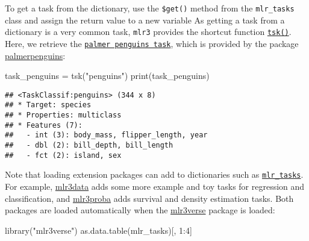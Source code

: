\documentclass[
]{scrbook}
\newenvironment{Shaded}{\begin{snugshade}}{\end{snugshade}}
\newcommand{\DecValTok}[1]{\textcolor[rgb]{0.00,0.00,0.81}{#1}}
\newcommand{\FunctionTok}[1]{\textcolor[rgb]{0.00,0.00,0.00}{#1}}
\newcommand{\NormalTok}[1]{#1}
\newcommand{\OtherTok}[1]{\textcolor[rgb]{0.56,0.35,0.01}{#1}}
\newcommand{\SpecialCharTok}[1]{\textcolor[rgb]{0.00,0.00,0.00}{#1}}
\newcommand{\StringTok}[1]{\textcolor[rgb]{0.31,0.60,0.02}{#1}}
\renewenvironment{Shaded} {\begin{snugshade}\small} {\end{snugshade}}
\begin{document}
To get a task from the dictionary, use the \texttt{\$get()} method from the \texttt{mlr\_tasks} class and assign the return value to a new variable
As getting a task from a dictionary is a very common task, \texttt{mlr3} provides the shortcut function \href{https://mlr3.mlr-org.com/reference/mlr_sugar.html}{\texttt{tsk()}}.
Here, we retrieve the \href{https://mlr3.mlr-org.com/reference/mlr_tasks_penguins.html}{\texttt{palmer\ penguins\ task}}, which is provided by the package \href{https://cran.r-project.org/package=palmerpenguins}{palmerpenguins}:

\begin{Shaded}
\begin{Highlighting}[]
\NormalTok{task\_penguins }\OtherTok{=} \FunctionTok{tsk}\NormalTok{(}\StringTok{"penguins"}\NormalTok{)}
\FunctionTok{print}\NormalTok{(task\_penguins)}
\end{Highlighting}
\end{Shaded}

\begin{verbatim}
## <TaskClassif:penguins> (344 x 8)
## * Target: species
## * Properties: multiclass
## * Features (7):
##   - int (3): body_mass, flipper_length, year
##   - dbl (2): bill_depth, bill_length
##   - fct (2): island, sex
\end{verbatim}

Note that loading extension packages can add to dictionaries such as \href{https://mlr3.mlr-org.com/reference/mlr_tasks.html}{\texttt{mlr\_tasks}}.
For example, \href{https://mlr3data.mlr-org.com}{mlr3data} adds some more example and toy tasks for regression and classification, and \href{https://mlr3proba.mlr-org.com}{mlr3proba} adds survival and density estimation tasks.
Both packages are loaded automatically when the \href{https://mlr3verse.mlr-org.com}{mlr3verse} package is loaded:

\begin{Shaded}
\begin{Highlighting}[]
\FunctionTok{library}\NormalTok{(}\StringTok{"mlr3verse"}\NormalTok{)}
\FunctionTok{as.data.table}\NormalTok{(mlr\_tasks)[, }\DecValTok{1}\SpecialCharTok{:}\DecValTok{4}\NormalTok{]}
\end{Highlighting}
\end{Shaded}
\end{document}
